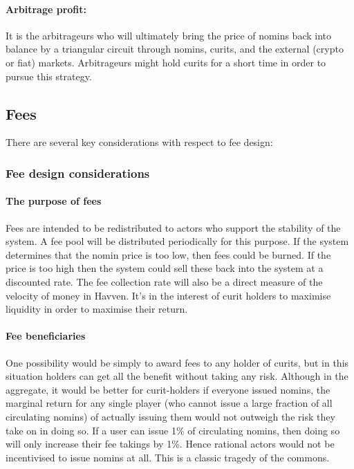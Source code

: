 \paragraph{Arbitrage profit:}
It is the arbitrageurs who will ultimately bring the price of nomins back into balance by a triangular circuit through nomins, curits, and the external (crypto or fiat) markets. Arbitrageurs might hold curits for a short time in order to pursue this strategy.



\pagebreak
\subsection{Fees}

There are several key considerations with respect to fee design:

\subsubsection{Fee design considerations}

\paragraph{The purpose of fees}

Fees are intended to be redistributed to actors who support the stability of the system. A fee pool will be distributed periodically for this purpose.
If the system determines that the nomin price is too low, then fees could be burned. If the price is too high then the system could sell these back
into the system at a discounted rate. The fee collection rate will also be a direct measure of the velocity of money in Havven. It's in the interest
of curit holders to maximise liquidity in order to maximise their return.

\paragraph{Fee beneficiaries}

One possibility would be simply to award fees to any holder of curits,
but in this situation holders can get all the benefit without taking any risk.
Although in the aggregate, it would be better for curit-holders if everyone issued nomins,
the marginal return for any single player (who cannot issue a large fraction of all circulating nomins)
of actually issuing them would not outweigh the risk they take on in doing so. If a user can issue 1\% of circulating
nomins, then doing so will only increase their fee takings by 1\%. Hence rational actors would not be incentivised to issue nomins at all.
This is a classic tragedy of the commons.


